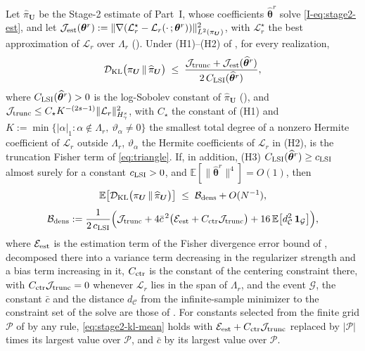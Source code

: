 \documentclass[review,hidelinks,onefignum,onetabnum]{siamart251216}
\newcommand{\EE}{\mathbb{E}}
\newcommand{\DKL}{\mathcal{D}_{\mathrm{KL}}}
\newcommand{\gauss}{\gamma}
\newcommand{\vbeta}{\bm{\theta}^{r}}
\newcommand{\hvbeta}{\widehat{\bm{\theta}}^{r}}
\newcommand{\vU}{\bm{U}}
\newcommand{\scL}{\mathcal{L}}
\begin{document}
\begin{theorem}
\label{thm:stage2-kl}
Let $\widehat\pi_{\vU}$ be the Stage-2 estimate of Part~I, whose coefficients $\hvbeta$ solve \eqref{I-eq:stage2-est}, and let $\mathcal J_{\rm est}(\vbeta) := \|\nabla(\scL_r^\star - \scL_r(\cdot\,;\vbeta))\|^2_{L^2(\pi_{\vU})}$, with $\scL_r^\star$ the best approximation of $\scL_r$ over $\Lambda_r$ (). Under (H1)--(H2) of , for every realization,
\begin{equation}
  \DKL\bigl(\pi_{\vU}\,\|\,\widehat\pi_{\vU}\bigr)
  \;\le\;
  \frac{\mathcal J_{\rm trunc} + \mathcal J_{\rm est}(\hvbeta)}{2\,C_{\rm LSI}(\hvbeta)},
  \label{eq:stage2-kl}
\end{equation}
where $C_{\rm LSI}(\hvbeta) > 0$ is the log-Sobolev constant of $\widehat\pi_{\vU}$ (), and $\mathcal J_{\rm trunc} \le C_\star K^{-(2s-1)}\|\scL_r\|^2_{H^s_{\gauss}}$, with $C_\star$ the constant of \textup{(H1)} and $K := \min\{|\alpha|_1 : \alpha\notin\Lambda_r,\ \vartheta_\alpha \ne 0\}$ the smallest total degree of a nonzero Hermite coefficient of $\scL_r$ outside $\Lambda_r$, $\vartheta_\alpha$ the Hermite coefficients of $\scL_r$ in \textup{(H2)}, is the truncation Fisher term of \eqref{eq:triangle}. If, in addition, \textup{(H3)} $C_{\rm LSI}(\hvbeta) \ge c_{\rm LSI}$ almost surely for a constant $c_{\rm LSI} > 0$, and $\EE[\|\hvbeta\|^4] = O(1)$, then
\begin{equation}
  \EE\bigl[\DKL\bigl(\pi_{\vU}\,\|\,\widehat\pi_{\vU}\bigr)\bigr]
  \;\le\;
  \mathcal B_{\rm dens} + O(N^{-1}),
  \label{eq:stage2-kl-mean}
\end{equation}
\[
  \mathcal B_{\rm dens} := \frac{1}{2\,c_{\rm LSI}}\Bigl(\mathcal J_{\rm trunc} + 4\bar c^{\,2}\bigl(\mathcal E_{\rm est} + C_{\rm ctr}\mathcal J_{\rm trunc}\bigr) + 16\,\EE\bigl[d_{\mathcal C}^2\,\mathbf 1_{\mathcal G}\bigr]\Bigr),
\]
where $\mathcal E_{\rm est}$ is the estimation term of the Fisher divergence error bound of , decomposed there into a variance term decreasing in the regularizer strength and a bias term increasing in it, $C_{\rm ctr}$ is the constant of the centering constraint there, with $C_{\rm ctr}\mathcal J_{\rm trunc} = 0$ whenever $\scL_r$ lies in the span of $\Lambda_r$, and the event $\mathcal G$, the constant $\bar c$ and the distance $d_{\mathcal C}$ from the infinite-sample minimizer to the constraint set of the solve are those of . For constants selected from the finite grid $\mathcal P$ of  by any rule, \eqref{eq:stage2-kl-mean} holds with $\mathcal E_{\rm est} + C_{\rm ctr}\mathcal J_{\rm trunc}$ replaced by $|\mathcal P|$ times its largest value over $\mathcal P$, and $\bar c$ by its largest value over $\mathcal P$.
\end{theorem}
\end{document}
